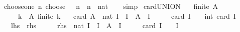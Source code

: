 \begin{isabellebody}
%
\isadelimdocument
%
\endisadelimdocument
{}\isamarkupfalse%
\ choose{\isacharunderscore}{\kern0pt}one{\isacharcolon}{\kern0pt}\ {\isachardoublequoteopen}n\ choose\ {}\ {\isacharequal}{\kern0pt}\ n{\isachardoublequoteclose}\ \ n\ {\isacharcolon}{\kern0pt}{\isacharcolon}{\kern0pt}\ nat\isanewline
%
\isadelimproof
\ \ %
\endisadelimproof
%
\isatagproof
{}\isamarkupfalse%
\ simp%
\endisatagproof
{\isafoldproof}%
%
\isadelimproof
\isanewline
%
\endisadelimproof
\isanewline
{}\isamarkupfalse%
\ card{\isacharunderscore}{\kern0pt}UNION{\isacharcolon}{\kern0pt}\isanewline
\ \ \ {\isachardoublequoteopen}finite\ A{\isachardoublequoteclose}\isanewline
\ \ \ \ \ {\isachardoublequoteopen}{\isasymforall}k\ {\isasymin}\ A{\isachardot}{\kern0pt}\ finite\ k{\isachardoublequoteclose}\isanewline
\ \ \ {\isachardoublequoteopen}card\ {\isacharparenleft}{\kern0pt}{\isasymUnion}A{\isacharparenright}{\kern0pt}\ {\isacharequal}{\kern0pt}\ nat\ {\isacharparenleft}{\kern0pt}{\isasymSum}I\ {\isacharbar}{\kern0pt}\ I\ {\isasymsubseteq}\ A\ {\isasymand}\ I\ {\isasymnoteq}\ {\isacharbraceleft}{\kern0pt}{\isacharbraceright}{\kern0pt}{\isachardot}{\kern0pt}\ {\isacharparenleft}{\kern0pt}{\isacharminus}{\kern0pt}\ {}{\isacharparenright}{\kern0pt}\ {\isacharcircum}{\kern0pt}\ {\isacharparenleft}{\kern0pt}card\ I\ {\isacharplus}{\kern0pt}\ {}{\isacharparenright}{\kern0pt}\ {\isacharasterisk}{\kern0pt}\ int\ {\isacharparenleft}{\kern0pt}card\ {\isacharparenleft}{\kern0pt}{\isasymInter}I{\isacharparenright}{\kern0pt}{\isacharparenright}{\kern0pt}{\isacharparenright}{\kern0pt}{\isachardoublequoteclose}\isanewline
\ \ {\isacharparenleft}{\kern0pt}\ {\isachardoublequoteopen}{\isacharquery}{\kern0pt}lhs\ {\isacharequal}{\kern0pt}\ {\isacharquery}{\kern0pt}rhs{\isachardoublequoteclose}{\isacharparenright}{\kern0pt}\isanewline
%
\isadelimproof
%
\endisadelimproof
%
\isatagproof
{}\isamarkupfalse%
\ {\isacharminus}{\kern0pt}\isanewline
\ \ \isamarkupfalse%
\ {\isachardoublequoteopen}{\isacharquery}{\kern0pt}rhs\ {\isacharequal}{\kern0pt}\ nat\ {\isacharparenleft}{\kern0pt}{\isasymSum}I\ {\isacharbar}{\kern0pt}\ I\ {\isasymsubseteq}\ A\ {\isasymand}\ I\ {\isasymnoteq}\ {\isacharbraceleft}{\kern0pt}{\isacharbraceright}{\kern0pt}{\isachardot}{\kern0pt}\ {\isacharparenleft}{\kern0pt}{\isacharminus}{\kern0pt}\ {}{\isacharparenright}{\kern0pt}\ {\isacharcircum}{\kern0pt}\ {\isacharparenleft}{\kern0pt}card\ I\ {\isacharplus}{\kern0pt}\ {}{\isacharparenright}{\kern0pt}\ {\isacharasterisk}{\kern0pt}\ {\isacharparenleft}{\kern0pt}{\isasymSum}{\isacharunderscore}{\kern0pt}{\isasymin}{\isasymInter}I{\isachardot}{\kern0pt}\ {}{\isacharparenright}{\kern0pt}{\isacharparenright}{\kern0pt}{\isachardoublequoteclose}\isanewline

\end{isabellebody}
